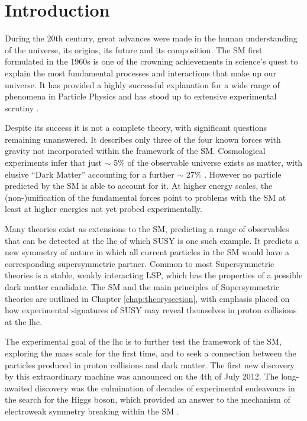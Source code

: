 \chapter{Introduction}
\label{chap:introduction}

During the 20th century, great advances were made in the human understanding of the universe, its origins, its future and its composition. The \acf{SM} first formulated in the 1960s is one of the crowning achievements in science's quest to explain the most fundamental processes and interactions that make up our universe. It has provided a highly successful explanation for a wide range of phenomena in Particle Physics and has stood up to extensive experimental scrutiny \cite{pdg2012}.

Despite its success it is not  a complete theory, with significant questions remaining unanswered. It describes only three of the four known forces with gravity not incorporated within the framework of the \ac{SM}. Cosmological experiments infer that just $\sim$ 5$\%$ of the observable universe exists as matter, with elusive ``Dark Matter'' accounting for a further $\sim$ 27$\%$ \cite{Ade:2013zuv}. However no particle predicted by the \ac{SM} is able to account for it.  At higher energy scales, the (non-)unification of the fundamental forces point to problems with the \ac{SM} at least at higher energies not yet probed experimentally. 

Many theories exist as extensions to the \ac{SM}, predicting a range of observables that can be detected at the \acf{lhc} of which \acf{SUSY} is one such example. It predicts a new symmetry of nature in which all current particles in the \ac{SM} would have a corresponding supersymmetric partner. Common to most Supersymmetric theories is a stable, weakly interacting \acf{LSP}, which has the properties of a possible dark matter candidate. The \ac{SM} and the main principles of Supersymmetric theories are outlined in Chapter \ref{chap:theorysection}, with emphasis placed on how experimental signatures of \ac{SUSY} may reveal themselves in proton collisions at the \ac{lhc}.

The experimental goal of the \ac{lhc} is to further test the framework of the \ac{SM}, exploring the \TeV mass scale for the first time, and to seek a connection between the particles produced in proton collisions and dark matter. The first new discovery by this extraordinary machine was announced on the 4th of July 2012. The long-awaited discovery was the culmination of decades of experimental endeavours in the search for the Higgs boson, which provided an answer to the mechanism of electroweak symmetry breaking within the \ac{SM} \cite{Aad:2012tfa}\cite{Chatrchyan:2012ufa}. 

